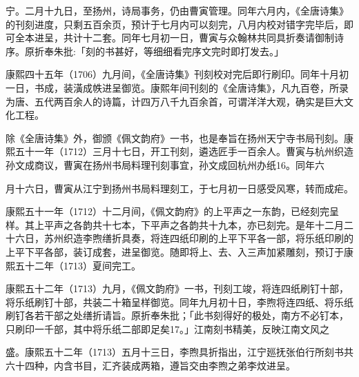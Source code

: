 \noindent 宁。二月十九日，至扬州，诗局事务，仍由曹寅管理。同年六月内，《全唐诗集》的刊刻进度，只剩五百余页，预计于七月内可以刻完，八月内校对错字完毕后，即可全本进呈，共计十二套。同年七月初一日，曹寅与众翰林共同具折奏请御制诗序。原折奉朱批:「刻的书甚好，等细细看完序文完时即打发去。」

康熙四十五年（1706）九月间，《全唐诗集》刊刻校对完后即行刷印。同年十月初一日，书成，装潢成帙进呈御览。康熙年间刊刻的《全唐诗集》，凡九百卷，所录为唐、五代两百余人的诗篇，计四万八千九百余首，可谓洋洋大观，确实是巨大文化工程。

除《全唐诗集》外，御颁《佩文韵府》一书，也是奉旨在扬州天宁寺书局刊刻。康熙五十一年（1712）三月十七日，开工刊刻，遴选匠手一百余人。曹寅与杭州织造孙文成商议，曹寅在扬州书局料理刊刻事宜，孙文成回杭州办纸16。同年六

\vfill
\begin{BookNotes}
\end{BookNotes}


\noindent 月十六日，曹寅从江宁到扬州书局料理刻工，于七月初一日感受风寒，转而成疟。

康熙五十一年（1712）十二月间，《佩文韵府》的上平声之一东韵，已经刻完呈样。其上平声之各韵共十七本，下平声之各韵共十九本，亦已刻完。是年十二月二十六日，苏州织造李煦缮折具奏，将连四纸印刷的上平下平各一部，将乐纸印刷的上平下平各部，装订成套，进呈御览。随即将上、去、入三声加紧雕刻，预订于康熙五十二年（1713）夏间完工。

康熙五十二年（1713）九月，《佩文韵府》一书，刊刻工竣，将连四纸刷钉十部，将乐纸刷钉十部，共装二十箱呈样御览。同年九月初十日，李煦将连四纸、将乐纸刷钉各若干部之处缮折请旨。原折奉朱批；「此书刻得好的极处，南方不必钉本，只刷印一千部，其中将乐纸二部即足矣17。」江南刻书精美，反映江南文风之


\noindent 盛。康熙五十二年（1713）五月十三日，李煦具折指出，江宁廵抚张伯行所刻书共六十四种，内含书目，汇齐装成两箱，遵旨交由李煦之弟李炆进呈。

\vfill
\begin{BookNotes}
\end{BookNotes}


